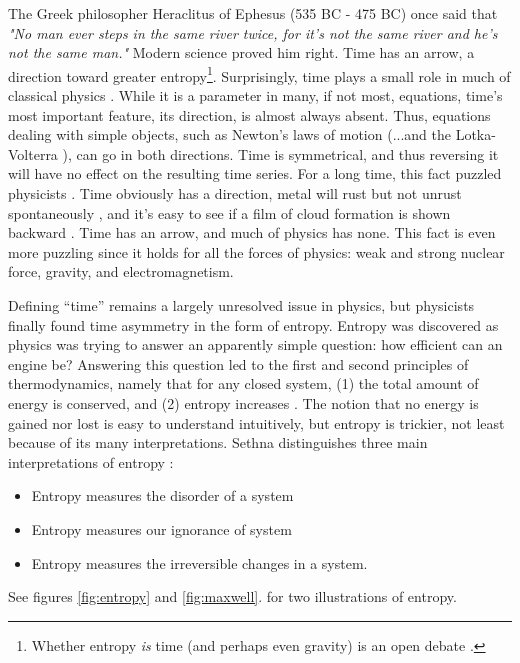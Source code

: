 \documentclass[letterpaper,12pt]{article}
\begin{document}
The Greek philosopher Heraclitus of Ephesus (535 BC - 475 BC) once said that
\emph{"No man ever steps in the same river twice, for it's not the same
river and he's not the same man."} Modern science proved him right. Time has
an arrow, a direction toward greater entropy\footnote{Whether entropy \emph
{is} time (and perhaps even gravity) is an open debate \cite{ver10}.}.
Surprisingly, time plays a small role in much of classical physics \cite
{ser04}. While it is a parameter in many, if not most, equations, time's
most important feature, its direction, is almost always absent. Thus,
equations dealing with simple objects, such as Newton's laws of motion
(...and the Lotka-Volterra \cite{cas99,tur03}), can go in both directions.
Time is symmetrical, and thus reversing it will have no effect on the
resulting time series. For a long time, this fact puzzled physicists \cite
{gou10}. Time obviously has a direction, metal will rust but not unrust
spontaneously \cite {mcq97}, and it's easy to see if a film of cloud
formation is shown backward \cite{wie48}. Time has an arrow, and much of
physics has none. This fact is even more puzzling since it holds for all the
forces of physics: weak and strong nuclear force, gravity, and
electromagnetism.

Defining ``time'' remains a largely unresolved issue in physics, but
physicists finally found time asymmetry in the form of entropy. Entropy was
discovered as physics was trying to answer an apparently simple question: how
efficient can an engine be? Answering this question led to the first and
second principles of thermodynamics, namely that for any closed system, (1)
the total amount of energy is conserved, and (2) entropy increases \cite{ser04}.
The notion that no energy is gained nor lost is easy to understand
intuitively, but entropy is trickier, not least because of its many
interpretations. Sethna distinguishes three main interpretations of entropy
\cite{set10}:

\begin{itemize}
  \item Entropy measures the disorder of a system
  \item Entropy measures our ignorance of system
  \item Entropy measures the irreversible changes in a system.
\end{itemize}

See figures \ref{fig:entropy} and \ref{fig:maxwell}. for two illustrations
of entropy.
\end{document}
